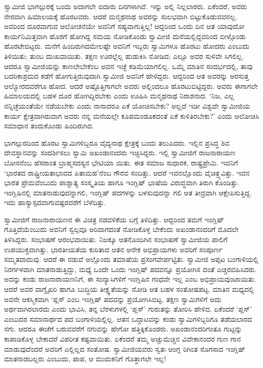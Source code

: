 ಸ್ವಾಮೀಜಿ ಭಾಗಲ್ಪುರಕ್ಕೆ ಬಂದು ಅದಾಗಲೇ ಐದಾರು ದಿನಗಳಾಗಿವೆ. ಇನ್ನು ಅಲ್ಲಿ ನಿಲ್ಲಲಾರರು. ಏಕೆಂದರೆ, ಅವರು ನೇರವಾಗಿ ಹಿಮಾಲಯಕ್ಕೆ ಹೊರಟವರು. ಆದರೆ ಮನ್ಮಥನಾಥ ಅವರನ್ನು ಸುಲಭವಾಗಿ ಬಿಟ್ಟುಕೊಡುವವನಲ್ಲ. ಅವರಿಂದ ದೂರವಾಗುವ ಆಲೋಚನೆಯೇ ಅವನಿಗೆ ಸಹ್ಯವಾಗುತ್ತಿಲ್ಲ! ಆದ್ದರಿಂದ ಒಂದು ದಿನ ಆತ ಯಾವುದೋ ಕಾರ್ಯನಿಮಿತ್ತವಾಗಿ ಹೊರಗೆ ಹೋಗಿದ್ದ ಸಮಯ ನೋಡಿಕೊಂಡು ಸ್ವಾಮೀಜಿ ಮನೆಯಲ್ಲಿದ್ದವರಿಂದ ಬೀಳ್ಗೊಂಡು ಹೊರಟೇಬಿಟ್ಟರು. ಮನೆಗೆ ಹಿಂದಿರುಗಿದಮೇಲಷ್ಟೇ ಅವನಿಗೆ ಇಬ್ಬರು ಸ್ವಾಮಿಗಳೂ ಹೊರಟು ಹೋದರು ಎಂಬುದು ತಿಳಿಯಿತು; ತುಂಬ ದುಃಖವಾಯಿತು. ತಕ್ಷಣ ಊರಲ್ಲೆಲ್ಲ ಹುಡುಕಿಸಿ ನೋಡಿದ; ಎಲ್ಲೂ ಅವರ ಸುಳಿವೇ ಸಿಗಲಿಲ್ಲ. ಆದರೂ ಸ್ವಾಮೀಜಿಯನ್ನು ಕಾಣಲೇಬೇಕೆಂಬ ಅವನ ಇಚ್ಛೆ ಕಡಿಮೆಯಾಗಲಿಲ್ಲ. ಒಮ್ಮೆ ಮಾತಿನ ಸಂದರ್ಭದಲ್ಲಿ, ತಾವು ಬದರಿಕಾಶ್ರಮದ ಕಡೆಗೆ ಹೋಗುತ್ತಿರುವುದಾಗಿ ಸ್ವಾಮೀಜಿ ಅವನಿಗೆ ಹೇಳಿದ್ದರು. ಆದ್ದರಿಂದ ಆತ ಅವರನ್ನು ಅರಸುತ್ತ ಆಲ್ಮೋರದವರೆಗೂ ಹೋದ. ಆದರೆ ಅಷ್ಟೊತ್ತಿಗಾಗಲೇ ಅವರು ಅಲ್ಲಿಂದಲೂ ಹೊರಟುಬಿಟ್ಟಿದ್ದರು. ಅವರು ಈಗಾಗಲೇ ಹಿಮಾಲಯದಲ್ಲಿ ಬಹಳ ದೂರ ಹೋಗಿದ್ದಿರಬೇಕು ಎಂದು ಊಹಿಸಿ ಮನ್ಮಥನಾಥ ನಿರಾಶನಾದ. ‘ನಿಜ, ಎಲ್ಲ ನನ್ನಿಚ್ಛೆಯಂತೆಯೇ ನಡೆಯಬೇಕು ಎಂದು ನಾನಾದರೂ ಏಕೆ ಯೋಚಿಸಬೇಕು? ಅಲ್ಲದೆ ಇಡೀ ವಿಶ್ವವೇ ಸ್ವಾಮೀಜಿಯ ಕಾರ್ಯ ಕ್ಷೇತ್ರವಾಗಿರುವಾಗ ಅವರು ನನ್ನ ಮನೆಯಲ್ಲೇ ಕೂಪಮಂಡೂಕದಂತೆ ಏಕೆ ಕುಳಿತಿರಬೇಕು?’ ಎಂದು ಆಲೋಚಿಸಿ ಸಮಾಧಾನ ತಂದುಕೊಂಡು ಹಿಂದಿರುಗಿದ.

ಭಾಗಲ್ಪುರದಿಂದ ಹೊರಟ ಸ್ವಾಮಿಗಳಿಬ್ಬರೂ ವೈದ್ಯನಾಥ ಕ್ಷೇತ್ರಕ್ಕೆ ಬಂದು ತಲುಪಿದರು. ಇಲ್ಲಿನ ಪ್ರಸಿದ್ಧ ಶಿವ ದೇವಸ್ಥಾನವನ್ನು ಸಂದರ್ಶಿಸಲು ಸ್ವಾಮಿ ಅಖಂಡಾನಂದರು ಇಚ್ಛಿಸಿದ್ದರು. ಇಲ್ಲಿ ಸ್ವಾಮೀಜಿಗೆ ರಾಜನಾರಾಯಣ ಬೋಸನೆಂಬ ಹೆಸರಾಂತ ಬ್ರಾಹ್ಮಸದಸ್ಯನ ಭೇಟಿಯಾ ಯಿತು. ಈತ ಸಮಾಜ ಸುಧಾರಕ, ರಾಷ್ಟ್ರಪ್ರೇಮಿ. ಇವನಿಗೆ ‘ಭಾರತದ ರಾಷ್ಟ್ರೀಯತಾಭಾವದ ಪಿತಾಮಹ’ನೆಂಬ ಗೌರವ ಸಂದಿತ್ತು. ಆದರೆ ಇವನಲ್ಲೊಂದು ವೈಚಿತ್ರ್ಯವಿತ್ತು. ಇವನ ಭಾರತ ಪ್ರೇಮವೆಂಬುದು ಪಾಶ್ಚಾತ್ಯ ಸಂಸ್ಕೃತಿಯ ಹಾಗೂ ಇಂಗ್ಲಿಷ್ ಭಾಷೆಯ ವಿರುದ್ಧವಾಗಿ ತಿರುಗಿ ಕೊಂಡಿತ್ತು. ಇಂಗ್ಲಿಷಿನಲ್ಲಿ ಮಾತನಾಡುವುದನ್ನಾಗಲಿ, ಇಂಗ್ಲಿಷ್ ಪದಗಳನ್ನು ಬಳಸುವುದನ್ನಾ ಗಲಿ ಆತ ತೀವ್ರವಾಗಿ ಆಕ್ಷೇಪಿಸುತ್ತಿದ್ದ. ಇದು ಹಾಸ್ಯಾಸ್ಪದವಾಗುವಷ್ಟರವರೆಗೆ ಬೆಳೆದಿತ್ತು.

ಸ್ವಾಮೀಜಿಗೆ ರಾಜನಾರಾಯಣನ ಈ ವಿಚಿತ್ರ ನಡವಳಿಕೆಯ ಬಗ್ಗೆ ತಿಳಿದಿತ್ತು. ಆದ್ದರಿಂದ ತಮಗೆ ಇಂಗ್ಲಿಷ್ ಗೊತ್ತಿದೆಯೆಂಬುದು ಅವನಿಗೆ ಸ್ವಲ್ಪವೂ ಅರಿವಾಗದಂತೆ ನೋಡಿಕೊಳ್ಳ ಬೇಕೆಂದು ಅಖಂಡಾನಂದರಿಗೆ ಮೊದಲೇ ತಿಳಿಸಿದ್ದರು. ಸಂಭಾಷಣೆ ಆರಂಭವಾಯಿತು. ನಿಜಕ್ಕೂ ಆತನೊಂದಿಗಿನ ಸಂಭಾಷಣೆ ಸ್ವಾಮೀಜಿಯ ಪಾಲಿಗೆ ಉಪಯುಕ್ತವಾಗಿತ್ತು. ಭಾರತೀಯತೆಯ ಕುರಿತಾದ ಆತನ ಅನೇಕ ಅಭಿಪ್ರಾಯಗಳು ಅವರಿಗೆ ಸಂಪೂರ್ಣ ಸಮ್ಮತವಾದುವು. ಆದರೆ ಈ ನಡುವೆ ಅಲ್ಲೊಂದು ತಮಾಷೆಯ ಪ್ರಸಂಗವೇರ್ಪಟ್ಟಿತು. ಸ್ವಾಮೀಜಿ ಅಪ್ಪಟ ಬಂಗಾಳಿಯಲ್ಲಿ ನಿರರ್ಗಳವಾಗಿ ಮಾತನಾಡುತ್ತಿದ್ದು, ಮಧ್ಯೆ ಒಂದೇ ಒಂದು ಇಂಗ್ಲಿಷ್ ಪದವನ್ನೂ ಪ್ರಯೋಗಿಸ ದಂತೆ ಎಚ್ಚರವಹಿಸಿದರು. ಅದನ್ನು ಕಂಡು ರಾಜನಾರಾಯಣನಿಗೆ, ಈ ಸಂನ್ಯಾಸಿಗಳಿಗೆ ಇಂಗ್ಲಿಷಿನ ಗಂಧವೇ ಇಲ್ಲ ಎಂಬ ಅಭಿಪ್ರಾಯವುಂಟಾಯಿತು. ಆದರೆ ಅವರ ವಾಗ್ವೈಖರಿ ಹಾಗೂ ಬುದ್ಧಿಯ ತೀಕ್ಷ್ಣತೆಯನ್ನು ನೋಡಿ ಆತ ಬಹಳ ಸಂತೋಷಪಟ್ಟ. ಮಾತಿನ ಮಧ್ಯದಲ್ಲಿ ಅವನೇ ಆಕಸ್ಮಿಕವಾಗಿ ‘ಪ್ಲಸ್ ಎಂಬ ಇಂಗ್ಲಿಷ್ ಪದವನ್ನು ಪ್ರಯೋಗಿಸಿಬಿಟ್ಟ. ತಕ್ಷಣ ಸ್ವಾಮಿಗಳಿಗೆ ಅದು ಅರ್ಥವಾಗಿರಲಾರದು ಎಂದು ಭಾವಿಸಿ, ತನ್ನ ಬೆರಳುಗಳಲ್ಲಿ ‘ಪ್ಲಸ್’ ಗುರುತನ್ನು ತೋರಿಸಿ ಹೇಳಿದ. ಏಕೆಂದರೆ ‘ಪ್ಲಸ್’ ಎಂಬುದರ ಸಮಾನಾರ್ಥದ ಪದ ಬಂಗಾಳಿಯಲ್ಲಿಲ್ಲ. ಆತನ ಒದ್ದಾಟವನ್ನು ಕಂಡು ಸ್ವಾಮಿಗಳಿಬ್ಬರಿಗೂ ತಡೆಯಲಾರದ ನಗು. ಆದರೂ ಈಚೆಗೆ ಬರುವವರೆಗೆ ನಗುವನ್ನು ಹೇಗೋ ಹತ್ತಿಕ್ಕಿಕೊಂಡರು. ಅಖಂಡಾನಂದರಿಗಂತೂ ಗುಟ್ಟನ್ನು ಕಾಪಾಡಿಕೊಳ್ಳ ಬೇಕಾದರೆ ವಿಪರೀತ ಕಷ್ಟವಾಯಿತು. ಏಕೆಂದರೆ ತಮ್ಮ ಅಚ್ಚುಮೆಚ್ಚಿನ ವಿವೇಕಾನಂದರ ಗುಣ ಗಾನ ಮಾಡುವುದೆಂದರೆ ಅವರಿಗೆ ಎಲ್ಲಿಲ್ಲದ ಸಂತೋಷ. ಸ್ವಾಮೀಜಿಯವರು ಸ್ವತಃ ಆಂಗ್ಲ ರಿಗಿಂತ ಸೊಗಸಾದ ಇಂಗ್ಲಿಷ್ ಮಾತನಾಡಬಲ್ಲರು ಎಂಬುದು, ಪಾಪ, ಆ ಮುದುಕನಿಗೆ ಗೊತ್ತಾಗಲೇ ಇಲ್ಲ!

